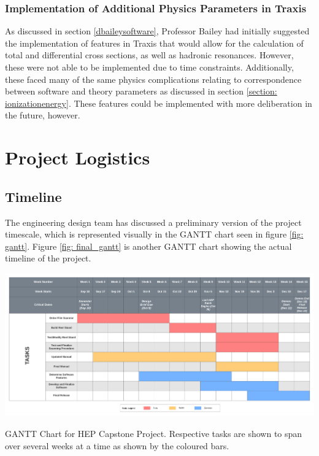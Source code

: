 \documentclass[12pt]{article} %
\begin{document}
\subsubsection{Implementation of Additional Physics Parameters in Traxis}
As discussed in section \ref{dbaileysoftware}, Professor Bailey had initially suggested the implementation of features in Traxis that would allow for the calculation of total and differential cross sections, as well as hadronic resonances. However, these were not able to be implemented due to time constraints. Additionally, these faced many of the same physics complications relating to correspondence between software and theory parameters as discussed in section \ref{section: ionizationenergy}. These features could be implemented with more deliberation in the future, however.




\newpage 
\section{Project Logistics}\label{Section: Gantt}
\subsection{Timeline}
The engineering design team has discussed a preliminary version of the project timescale, which is represented visually in the GANTT chart seen in figure \ref{fig: gantt}. Figure \ref{fig: final_gantt} is another GANTT chart showing the actual timeline of the project.

\begin{SidewaysFigure}
    \includegraphics[width = 1.0\linewidth]{Images/Gantt chart - HEP.png} 
    \caption{GANTT Chart for HEP Capstone Project. Respective tasks are shown to span over several weeks at a time as shown by the coloured bars.}
    \label{fig: gantt}
\end{SidewaysFigure}
\end{document}
